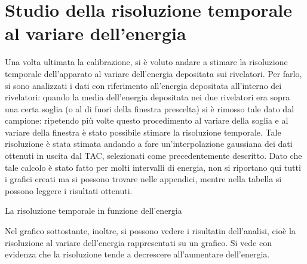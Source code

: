 \section{Studio della risoluzione temporale al variare dell'energia}

Una volta ultimata la calibrazione, si è voluto andare a stimare la risoluzione temporale dell'apparato al variare dell'energia depositata sui
rivelatori. Per farlo, si sono analizzati i dati con riferimento all'energia depositata all'interno dei rivelatori: quando la media dell'energia
depositata nei due rivelatori era sopra una certa soglia (o al di fuori della finestra prescelta) si è rimosso tale dato dal campione: ripetendo più
volte questo procedimento al variare della soglia e al variare della finestra è stato possibile stimare la risoluzione temporale. Tale
risoluzione è stata stimata andando a fare un'interpolazione gaussiana dei dati ottenuti in uscita dal TAC, selezionati come precedentemente descritto.
Dato che tale calcolo è stato fatto per molti intervalli di energia, non si riportano qui tutti i grafici creati ma si possono trovare nelle appendici,
mentre nella tabella si possono leggere i risultati ottenuti.
%
\begin{tabella}
	\centering
	
	\caption{La risoluzione temporale in funzione dell'energia}
	\label{tab:01tab1}
\end{tabella}
%
Nel grafico sottostante, inoltre, si possono vedere i risultatin dell'analisi, cioè la risoluzione al variare dell'energia rappresentati su un grafico. Si
vede con evidenza che la risoluzione tende a decrescere all'aumentare dell'energia.
\\
